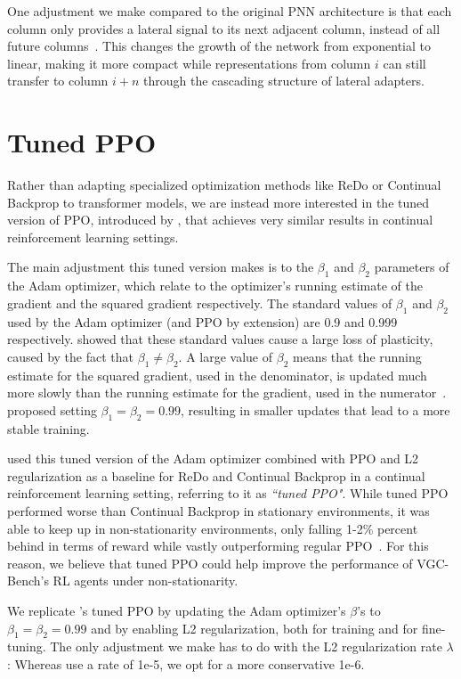 One adjustment we make compared to the original PNN architecture is that each column only provides a lateral signal to its next adjacent column, instead of all future columns~\cite{rusu2016pnn}.
This changes the growth of the network from exponential to linear, making it more compact while representations from column $i$ can still transfer to column $i + n$ through the cascading structure of lateral adapters.

\FloatBarrier

\section{Tuned PPO} \label{sec:tuned}
Rather than adapting specialized optimization methods like ReDo or Continual Backprop to transformer models, we are instead more interested in the tuned version of PPO, introduced by \textcite{dohare2024plasticity}, that achieves very similar results in continual reinforcement learning settings.

The main adjustment this tuned version makes is to the $\beta_1$ and $\beta_2$ parameters of the Adam optimizer, which relate to the optimizer's running estimate of the gradient and the squared gradient respectively.
The standard values of $\beta_1$ and $\beta_2$ used by the Adam optimizer (and PPO by extension) are 0.9 and 0.999 respectively.
\textcite{lyle2023plasticity} showed that these standard values cause a large loss of plasticity, caused by the fact that $\beta_1 \neq \beta_2$.
A large value of $\beta_2$ means that the running estimate for the squared gradient, used in the denominator, is updated much more slowly than the running estimate for the gradient, used in the numerator~\cite{dohare2024plasticity,lyle2023plasticity}.
\textcite{lyle2023plasticity} proposed setting $\beta_1 = \beta_2 = 0.99$, resulting in smaller updates that lead to a more stable training.

\textcite{dohare2024plasticity} used this tuned version of the Adam optimizer combined with PPO and L2 regularization as a baseline for ReDo and Continual Backprop in a continual reinforcement learning setting, referring to it as \textit{``tuned PPO"}.
While tuned PPO performed worse than Continual Backprop in stationary environments, it was able to keep up in non-stationarity environments, only falling 1-2\% percent behind in terms of reward while vastly outperforming regular PPO~\cite{dohare2024plasticity}.
For this reason, we believe that tuned PPO could help improve the performance of VGC-Bench's RL agents under non-stationarity.

We replicate \textcite{dohare2024plasticity}'s tuned PPO by updating the Adam optimizer's $\beta$'s to $\beta_1 = \beta_2 = 0.99$ and by enabling L2 regularization, both for training and for fine-tuning.
The only adjustment we make has to do with the L2 regularization rate $\lambda$: Whereas \textcite{dohare2024plasticity} use a rate of 1e-5, we opt for a more conservative 1e-6.
